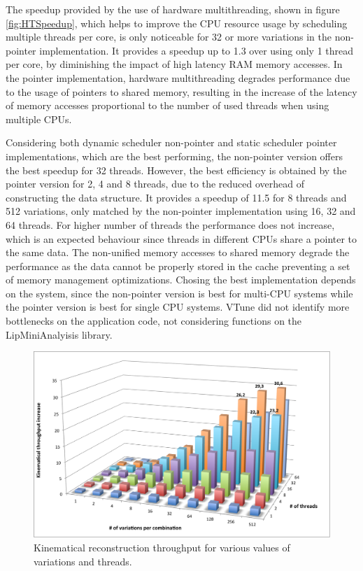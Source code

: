 The speedup provided by the use of hardware multithreading, shown in figure \ref{fig:HTSpeedup}, which helps to improve the CPU resource usage by scheduling multiple threads per core, is only noticeable for 32 or more variations in the non-pointer implementation. It provides a speedup up to 1.3 over using only 1 thread per core, by diminishing the impact of high latency RAM memory accesses. In the pointer implementation, hardware multithreading degrades performance due to the usage of pointers to shared memory, resulting in the increase of the latency of memory accesses proportional to the number of used threads when using multiple CPUs.

Considering both dynamic scheduler non-pointer and static scheduler pointer implementations, which are the best performing, the non-pointer version offers the best speedup for 32 threads. However, the best efficiency is obtained by the pointer version for 2, 4 and 8 threads, due to the reduced overhead of constructing the data structure. It provides a speedup of 11.5 for 8 threads and 512 variations, only matched by the non-pointer implementation using 16, 32 and 64 threads. For higher number of threads the performance does not increase, which is an expected behaviour since threads in different CPUs share a pointer to the same data. The non-unified memory accesses to shared memory degrade the performance as the data cannot be properly stored in the cache preventing a set of memory management optimizations. Chosing the best implementation depends on the system, since the non-pointer version is best for multi-CPU systems while the pointer version is best for single CPU systems. VTune did not identify more bottlenecks on the application code, not considering functions on the LipMiniAnalyisis library.

\begin{figure}[!htp]
	\begin{center}
		\includegraphics[scale=0.6]{../../common/graphs/dilep_throughput.png}
		\caption{Kinematical reconstruction throughput for various values of variations and threads.}
		\label{fig:DilepThroughput}
	\end{center}
\end{figure}

